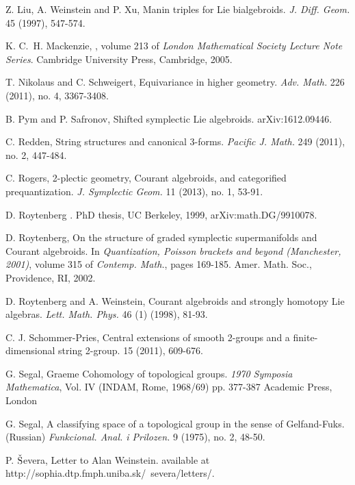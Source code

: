 \documentclass[letterpaper,10pt, oneside]{article} %
\begin{document}
\begin{thebibliography}{}
%
Z. Liu, A. Weinstein and P. Xu, Manin triples for Lie
bialgebroids. {\em J. Diff. Geom.} 45 (1997), 547-574.

K. C.~H. Mackenzie,
, volume
  213 of {\em London Mathematical Society Lecture Note Series}.
\newblock Cambridge University Press, Cambridge, 2005.


T. Nikolaus and C. Schweigert,   Equivariance in higher geometry. \emph{Adv. Math.} 226 (2011), no. 4, 3367-3408.

 B. Pym and P. Safronov, Shifted symplectic Lie algebroids. arXiv:1612.09446.


C. Redden,   String structures and canonical 3-forms. \emph{Pacific J. Math.} 249 (2011), no. 2, 447-484.

C. Rogers,  2-plectic geometry, Courant algebroids, and categorified prequantization. \emph{J. Symplectic Geom.} 11 (2013), no. 1, 53-91.

D. Roytenberg
. PhD thesis, UC Berkeley, 1999, arXiv:math.DG/9910078.

D. Roytenberg,
\newblock On the structure of graded symplectic supermanifolds and {C}ourant
  algebroids. \newblock In {\em Quantization, Poisson brackets and beyond (Manchester,
  2001)}, volume 315 of {\em Contemp. Math.}, pages 169-185. Amer. Math. Soc.,  Providence, RI, 2002.

D. Roytenberg  and A. Weinstein,
\newblock Courant algebroids and strongly homotopy {L}ie algebras.
\emph{ Lett. Math. Phys.} 46 (1) (1998), 81-93.




C. J. Schommer-Pries,
Central  extensions  of  smooth  2-groups  and  a  finite-dimensional
string 2-group.    15 (2011), 609-676.

G. Segal, Graeme Cohomology of topological groups. \emph{1970 Symposia Mathematica}, Vol. IV (INDAM, Rome, 1968/69) pp. 377-387 Academic Press, London

G. Segal,  A classifying space of a topological group in the sense of Gelfand-Fuks. (Russian) \emph{Funkcional. Anal. i Prilozen.} 9 (1975), no. 2, 48-50.

P. ${\rm\check{S}}$evera,   Letter to Alan Weinstein. available at http://sophia.dtp.fmph.uniba.sk/~severa/letters/.


\end{thebibliography}
\end{document}
